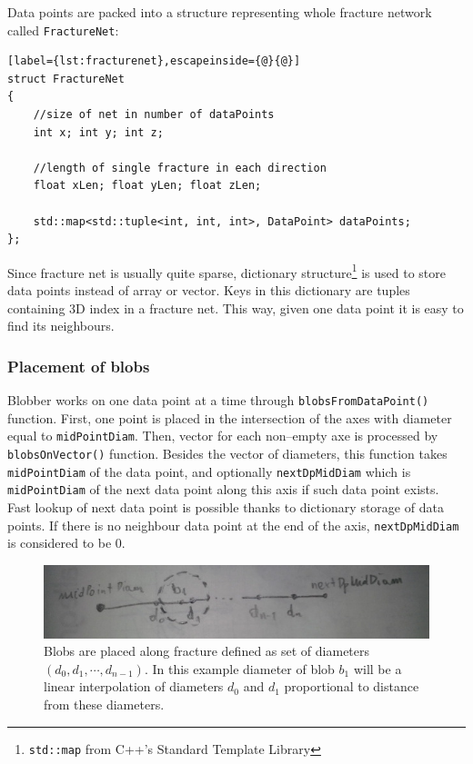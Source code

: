 Data points are packed into a structure representing whole fracture network
called \texttt{FractureNet}:
\begin{lstlisting}[label={lst:fracturenet},escapeinside={@}{@}]
struct FractureNet
{
	//size of net in number of dataPoints
	int x; int y; int z;
	
	//length of single fracture in each direction
	float xLen; float yLen; float zLen;
	
	std::map<std::tuple<int, int, int>, DataPoint> dataPoints;
};
\end{lstlisting}

Since fracture net is usually quite sparse, dictionary structure\footnote{\texttt{std::map} from C++'s Standard Template Library}
is used to store data points instead of array or vector. Keys in this dictionary
are tuples containing 3D index in a fracture net. This way, given one data point
it is easy to find its neighbours.

\subsubsection{Placement of blobs}

Blobber works on one data point at a time through \texttt{blobs\-From\-Data\-Point()}
function. First, one point is placed in the intersection of the axes with
diameter equal to \texttt{mid\-Point\-Diam}. Then, vector for each non--empty
axe is processed by \texttt{blobsOnVector()} function. Besides the vector of
diameters, this function takes \texttt{midPointDiam} of the data point, and optionally
\texttt{nextDpMidDiam} which is \texttt{midPointDiam} of the next data point
along this axis if such data point exists. Fast lookup of next data point
is possible thanks to dictionary storage of data points. If there is no neighbour data
point at the end of the axis, \texttt{nextDpMidDiam} is considered to be 0.

\begin{figure}[htb]
  \begin{center}
    \includegraphics[width=\textwidth]{chapters/project/placement.jpg}
  \end{center}
  \caption{Blobs are placed along fracture defined as set of diameters
    $(d_0,d_1,\cdots,d_{n-1})$. In this example diameter of blob $b_1$ will be a
    linear interpolation of diameters $d_0$ and $d_1$ proportional to distance
    from these diameters.}
  \label{fig:placement}
\end{figure}


